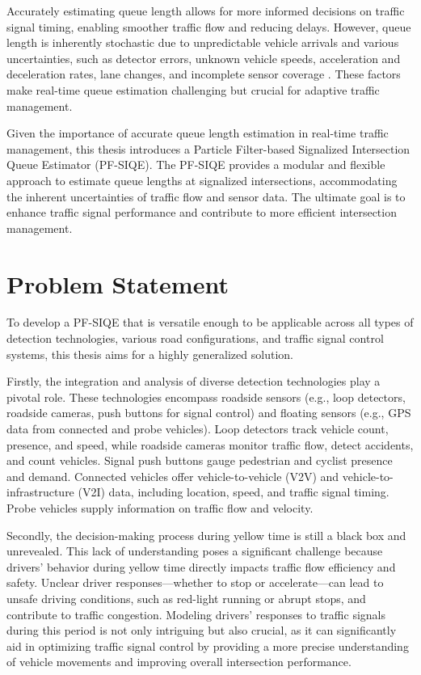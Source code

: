 Accurately estimating queue length allows for more informed decisions on traffic signal timing, enabling smoother traffic flow and reducing delays. However, queue length is inherently stochastic due to unpredictable vehicle arrivals and various uncertainties, such as detector errors, unknown vehicle speeds, acceleration and deceleration rates, lane changes, and incomplete sensor coverage \textcite{cheng2016review}. These factors make real-time queue estimation challenging but crucial for adaptive traffic management.

Given the importance of accurate queue length estimation in real-time traffic management, this thesis introduces a Particle Filter-based Signalized Intersection Queue Estimator (PF-SIQE). The PF-SIQE provides a modular and flexible approach to estimate queue lengths at signalized intersections, accommodating the inherent uncertainties of traffic flow and sensor data. The ultimate goal is to enhance traffic signal performance and contribute to more efficient intersection management.

\section{Problem Statement}\label{section:Problem Statement}
To develop a PF-SIQE that is versatile enough to be applicable across all types of detection technologies, various road configurations, and traffic signal control systems, this thesis aims for a highly generalized solution.

Firstly, the integration and analysis of diverse detection technologies play a pivotal role. These technologies encompass roadside sensors (e.g., loop detectors, roadside cameras, push buttons for signal control) and floating sensors (e.g., GPS data from connected and probe vehicles). Loop detectors track vehicle count, presence, and speed, while roadside cameras monitor traffic flow, detect accidents, and count vehicles. Signal push buttons gauge pedestrian and cyclist presence and demand. Connected vehicles offer vehicle-to-vehicle (V2V) and vehicle-to-infrastructure (V2I) data, including location, speed, and traffic signal timing. Probe vehicles supply information on traffic flow and velocity.

Secondly, the decision-making process during yellow time is still a black box and unrevealed. This lack of understanding poses a significant challenge because drivers' behavior during yellow time directly impacts traffic flow efficiency and safety. Unclear driver responses—whether to stop or accelerate—can lead to unsafe driving conditions, such as red-light running or abrupt stops, and contribute to traffic congestion. Modeling drivers' responses to traffic signals during this period is not only intriguing but also crucial, as it can significantly aid in optimizing traffic signal control by providing a more precise understanding of vehicle movements and improving overall intersection performance.



